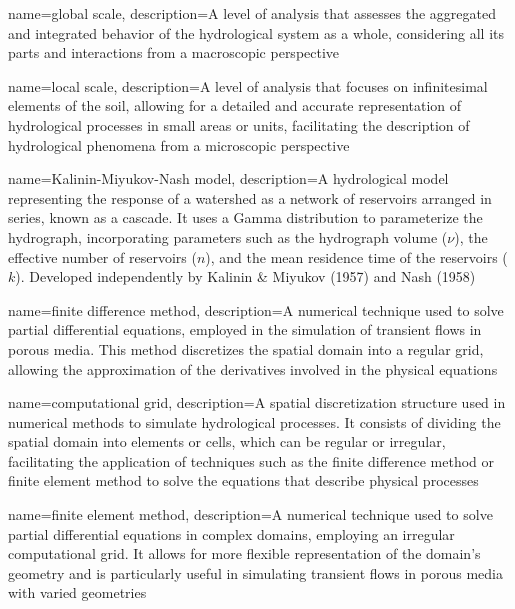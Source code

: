 {
    name=global scale,
    description={A level of analysis that assesses the aggregated and integrated behavior of the hydrological system as a whole, considering all its parts and interactions from a macroscopic perspective}
}

{
    name=local scale,
    description={A level of analysis that focuses on infinitesimal elements of the soil, allowing for a detailed and accurate representation of hydrological processes in small areas or units, facilitating the description of hydrological phenomena from a microscopic perspective}
}

{
    name=Kalinin-Miyukov-Nash model,
    description={A hydrological model representing the response of a watershed as a network of reservoirs arranged in series, known as a cascade. It uses a Gamma distribution to parameterize the hydrograph, incorporating parameters such as the hydrograph volume ($\nu$), the effective number of reservoirs ($n$), and the mean residence time of the reservoirs ($k$). Developed independently by Kalinin \& Miyukov (1957) and Nash (1958)}
}

{
    name=finite difference method,
    description={A numerical technique used to solve partial differential equations, employed in the simulation of transient flows in porous media. This method discretizes the spatial domain into a regular grid, allowing the approximation of the derivatives involved in the physical equations}
}

{
    name=computational grid,
    description={A spatial discretization structure used in numerical methods to simulate hydrological processes. It consists of dividing the spatial domain into elements or cells, which can be regular or irregular, facilitating the application of techniques such as the finite difference method or finite element method to solve the equations that describe physical processes}
}

{
    name=finite element method,
    description={A numerical technique used to solve partial differential equations in complex domains, employing an irregular computational grid. It allows for more flexible representation of the domain's geometry and is particularly useful in simulating transient flows in porous media with varied geometries}
}

